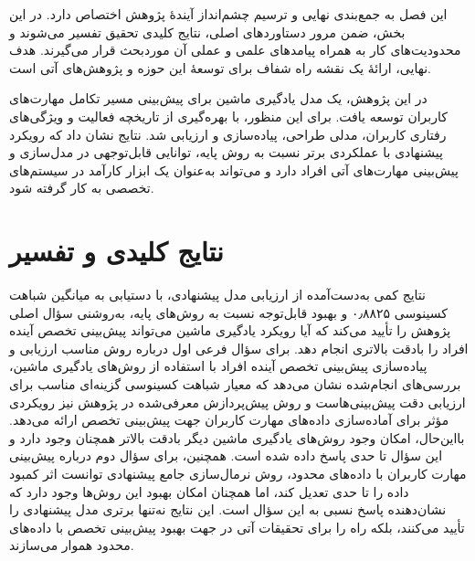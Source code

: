 
این فصل به جمع‌بندی نهایی و ترسیم چشم‌انداز آیندهٔ پژوهش اختصاص دارد. در این بخش، ضمن مرور دستاوردهای اصلی، نتایج کلیدی تحقیق تفسیر می‌شوند و محدودیت‌های کار به همراه پیامدهای علمی و عملی آن موردبحث قرار می‌گیرند. هدف نهایی، ارائهٔ یک نقشه راه شفاف برای توسعهٔ این حوزه و پژوهش‌های آتی است.

در این پژوهش، یک مدل یادگیری ماشین برای پیش‌بینی مسیر تکامل مهارت‌های کاربران توسعه یافت. برای این منظور، با بهره‌گیری از تاریخچه فعالیت و ویژگی‌های رفتاری کاربران، مدلی طراحی، پیاده‌سازی و ارزیابی شد. نتایج نشان داد که رویکرد پیشنهادی با عملکردی برتر نسبت به روش پایه، توانایی قابل‌توجهی در مدل‌سازی و پیش‌بینی مهارت‌های آتی افراد دارد و می‌تواند به‌عنوان یک ابزار کارآمد در سیستم‌های تخصصی به کار گرفته شود.

\section{نتایج کلیدی و تفسیر}
\label{sec:results}

نتایج کمی به‌دست‌آمده از ارزیابی مدل پیشنهادی، با دستیابی به میانگین شباهت کسینوسی ۰٫۸۸۲۵ و بهبود قابل‌توجه نسبت به روش‌های پایه، به‌روشنی سؤال اصلی پژوهش را تأیید می‌کند که آیا رویکرد یادگیری ماشین می‌تواند پیش‌بینی تخصص آینده افراد را بادقت بالاتری انجام دهد. برای سؤال فرعی اول درباره روش مناسب ارزیابی و پیاده‌سازی پیش‌بینی تخصص آینده افراد با استفاده از روش‌های یادگیری ماشین، بررسی‌های انجام‌شده نشان می‌دهد که معیار شباهت کسینوسی گزینه‌ای مناسب برای ارزیابی دقت پیش‌بینی‌هاست و روش پیش‌پردازش معرفی‌شده در پژوهش نیز رویکردی مؤثر برای آماده‌سازی داده‌های مهارت کاربران جهت پیش‌بینی تخصص ارائه می‌دهد. بااین‌حال، امکان وجود روش‌های یادگیری ماشین دیگر بادقت بالاتر همچنان وجود دارد و این سؤال تا حدی پاسخ داده شده است. همچنین، برای سؤال دوم درباره پیش‌بینی مهارت کاربران با داده‌های محدود، روش نرمال‌سازی جامع پیشنهادی توانست اثر کمبود داده را تا حدی تعدیل کند، اما همچنان امکان بهبود این روش‌ها وجود دارد که نشان‌دهنده پاسخ نسبی به این سؤال است. این نتایج نه‌تنها برتری مدل پیشنهادی را تأیید می‌کنند، بلکه راه را برای تحقیقات آتی در جهت بهبود پیش‌بینی تخصص با داده‌های محدود هموار می‌سازند.


